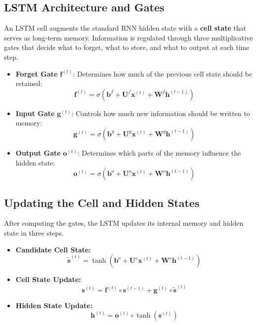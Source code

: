 \documentclass{article}
\begin{document}
\subsection{LSTM Architecture and Gates}

An LSTM cell augments the standard RNN hidden state with a \textbf{cell state} that serves as long-term memory. Information is regulated through three multiplicative gates that decide what to forget, what to store, and what to output at each time step.

\begin{itemize}
    \item \textbf{Forget Gate} \( \mathbf{f}^{(t)} \):  
    Determines how much of the previous cell state should be retained:
    \[
    \mathbf{f}^{(t)} 
    = \sigma(\mathbf{b}^f + \mathbf{U}^f \mathbf{x}^{(t)} + \mathbf{W}^f \mathbf{h}^{(t-1)})
    \]

    \item \textbf{Input Gate} \( \mathbf{g}^{(t)} \):  
    Controls how much new information should be written to memory:
    \[
    \mathbf{g}^{(t)} 
    = \sigma(\mathbf{b}^g + \mathbf{U}^g \mathbf{x}^{(t)} + \mathbf{W}^g \mathbf{h}^{(t-1)})
    \]

    \item \textbf{Output Gate} \( \mathbf{o}^{(t)} \):  
    Determines which parts of the memory influence the hidden state:
    \[
    \mathbf{o}^{(t)} 
    = \sigma(\mathbf{b}^o + \mathbf{U}^o \mathbf{x}^{(t)} + \mathbf{W}^o \mathbf{h}^{(t-1)})
    \]
\end{itemize}

\subsection{Updating the Cell and Hidden States}

After computing the gates, the LSTM updates its internal memory and hidden state in three steps.

\begin{itemize}

\item \textbf{Candidate Cell State:}
\[
\tilde{\mathbf{s}}^{(t)} 
= \tanh(\mathbf{b}^c + \mathbf{U}^c \mathbf{x}^{(t)} + \mathbf{W}^c \mathbf{h}^{(t-1)})
\]

\item \textbf{Cell State Update:}
\[
\mathbf{s}^{(t)} 
= \mathbf{f}^{(t)} \circ \mathbf{s}^{(t-1)} 
+ \mathbf{g}^{(t)} \circ \tilde{\mathbf{s}}^{(t)}
\]

\item \textbf{Hidden State Update:}
\[
\mathbf{h}^{(t)} 
= \mathbf{o}^{(t)} \circ \tanh(\mathbf{s}^{(t)})
\]

\end{itemize}
\end{document}
